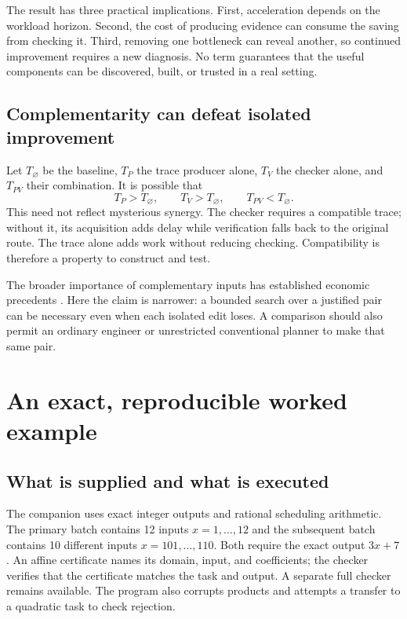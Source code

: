 \documentclass[11pt,letterpaper]{article}
\theoremstyle{remark}\newtheorem{remark}{Remark}[section]
\begin{document}
The result has three practical implications.
First, acceleration depends on the workload horizon.
Second, the cost of producing evidence can consume the saving from checking it.
Third, removing one bottleneck can reveal another, so continued improvement requires a new diagnosis.
No term guarantees that the useful components can be discovered, built, or trusted in a real setting.

\subsection{Complementarity can defeat isolated improvement}
Let $T_{\varnothing}$ be the baseline, $T_P$ the trace producer alone, $T_V$ the checker alone, and $T_{PV}$ their combination.
It is possible that
\begin{equation}
 T_P>T_{\varnothing},\qquad T_V>T_{\varnothing},\qquad
 T_{PV}<T_{\varnothing}.
\end{equation}
This need not reflect mysterious synergy.
The checker requires a compatible trace; without it, its acquisition adds delay while verification falls back to the original route.
The trace alone adds work without reducing checking.
Compatibility is therefore a property to construct and test.

The broader importance of complementary inputs has established economic precedents \citep{kremer1993}.
Here the claim is narrower: a bounded search over a justified pair can be necessary even when each isolated edit loses.
A comparison should also permit an ordinary engineer or unrestricted conventional planner to make that same pair.

\section{An exact, reproducible worked example}\label{sec:example}

\subsection{What is supplied and what is executed}
The companion uses exact integer outputs and rational scheduling arithmetic.
The primary batch contains 12 inputs $x=1,\ldots,12$ and the subsequent batch contains 10 different inputs $x=101,\ldots,110$.
Both require the exact output $3x+7$.
An affine certificate names its domain, input, and coefficients; the checker verifies that the certificate matches the task and output.
A separate full checker remains available.
The program also corrupts products and attempts a transfer to a quadratic task to check rejection.
\end{document}
